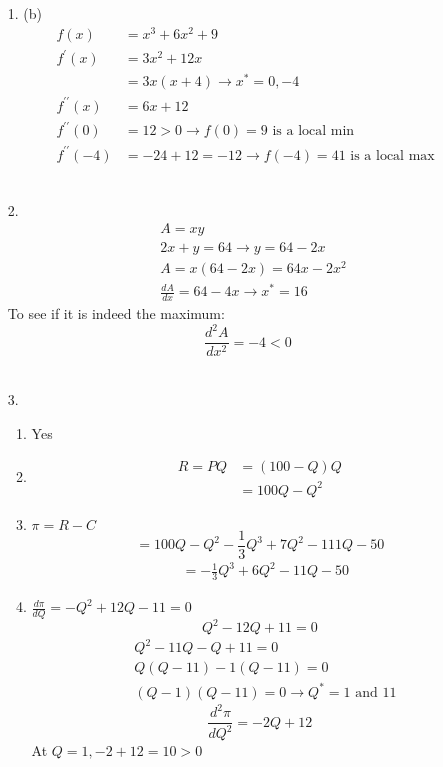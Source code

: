 \documentclass{./../../Latex/homework}
\begin{document}
\begin{enumerate}
\item[1.] (b)
$$
\begin{aligned}
f(x) &=x^{3}+6 x^{2}+9 \\
f^{\prime}(x) &=3 x^{2}+12 x \\
&=3 x(x+4) \rightarrow x^{*}=0,-4 \\
f^{\prime \prime}(x) &=6 x+12 \\
f^{\prime \prime}(0) &=12>0 \rightarrow f(0)=9 \text { is a local min } \\
f^{\prime \prime}(-4) &=-24+12=-12 \rightarrow f(-4) = 41 \text { is a local max }
\end{aligned}
$$ \\

\item[2.]
$$
\begin{aligned}
&A=x y \\
&2 x+y=64 \rightarrow y=64-2 x \\
&A=x(64-2 x)=64 x-2 x^{2} \\
&\frac{d A}{d x}=64-4 x \rightarrow x^*=16
\end{aligned}
$$
To see if it is indeed the maximum:
$$
\frac{d^2 A}{d x^2}=-4 <0 
$$ \\

\item[3.]
\begin{enumerate}
\item Yes
\item
$$
\begin{aligned}
R = P Q &= (100-Q) Q \\
&=100 Q-Q^{2}
\end{aligned}
$$
\item $\pi=R-C$
$$
=100 Q-Q^{2}-\frac{1}{3} Q^{3}+7 Q^{2}-111 Q-50
$$
$$
\begin{aligned}
& =-\frac{1}{3} Q^{3}+6 Q^{2}-11 Q-50
\end{aligned}
$$
\item $\frac{d \pi}{d Q}=-Q^{2}+12 Q-11=0$
$$
Q^{2}-12 Q+11=0
$$
$$
\begin{aligned}
& Q^{2}-11 Q-Q+11=0 \\
& Q(Q-11)-1(Q-11)=0 \\
& (Q-1)(Q-11)=0 \rightarrow Q^{*}=1 \text { and } 11
\end{aligned}
$$
$$
\frac{d^{2} \pi}{d Q^{2}}=-2 Q+12
$$
At $Q=1,-2+12=10>0$


\end{enumerate}
\end{enumerate}
\end{document}

